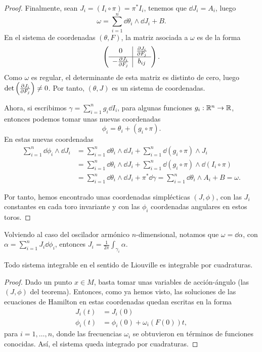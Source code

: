 \begin{proof}
Finalmente, sean $J_i=(I_i \circ \pi)=\pi^* I_i$, tenemos que $\dd J_i = A_i$, luego
\[
  \omega = \sum_{i=1}^n \dd \theta_i \wedge \dd J_i + B.
\]
En el sistema de coordenadas $(\theta,F)$, la matriz asociada a $\omega$ es de la forma
\[
\left(
\begin{array}{c|c}
  0 & \frac{\partial J_i}{\partial F_j} \\
  \hline 
  -\frac{\partial J_i}{\partial F_j} & b_{ij}
\end{array}\right).
\]
Como $\omega$ es regular, el determinante de esta matriz es distinto de cero, luego $\det\left(\frac{\partial J_i}{\partial F_j}\right)\neq 0$. Por tanto, $(\theta,J)$ es un sistema de coordenadas.

Ahora, si escribimos $\gamma= \sum_{i=1}^n g_i \dd I_i$, para algunas funciones $g_i:\mathbb{R}^n \rightarrow \mathbb{R}$, entonces podemos tomar unas nuevas coordenadas 
\[
  \phi_i= \theta_i + (g_i \circ \pi).
\]
En estas nuevas coordenadas
\[
\begin{split}
  \sum_{i=1}^n \dd \phi_i \wedge \dd J_i & = \sum_{i=1}^n \dd \theta_i \wedge \dd J_i + \sum_{i=1}^n \dd(g_i \circ \pi) \wedge J_i \\
   & =\sum_{i=1}^n \dd \theta_i \wedge \dd J_i + \sum_{i=1}^n \dd(g_i \circ \pi) \wedge \dd (I_i \circ \pi) \\
   & =\sum_{i=1}^n \dd \theta_i \wedge \dd J_i + \pi^* \dd \gamma = \sum_{i=1}^n \dd \theta_i \wedge A_i + B = \omega.
\end{split}
\]

Por tanto, hemos encontrado unas coordenadas simplécticas $(J,\phi)$, con las $J_i$ constantes en cada toro invariante y con las $\phi_i$ coordenadas angulares en estos toros.
\end{proof}

\begin{obs}
  Volviendo al caso del oscilador armónico $n$-dimensional, notamos que $\omega=\dd \alpha$, con $\alpha=\sum_{i=1}^n J_i \dd \phi_i$, entonces $J_i=\frac{1}{2\pi}\int_{\gamma_i}\alpha$.
\end{obs}

\begin{corol}
  Todo sistema integrable en el sentido de Liouville es integrable por cuadraturas.
\end{corol}

\begin{proof}
  Dado un punto $x \in M$, basta tomar unas variables de acción-ángulo (las $(J,\phi)$ del teorema). Entonces, como ya hemos visto, las soluciones de las ecuaciones de Hamilton en estas coordenadas quedan escritas en la forma
  \begin{align*}
    J_i(t) & = J_i (0) \\
    \phi_i(t) & = \phi_i(0) + \omega_i(F(0))t,
  \end{align*}
  para $i=1,\dots,n$, donde las frecuencias $\omega_i$ se obtuvieron en términos de funciones conocidas. Así, el sistema queda integrado por cuadraturas.
\end{proof}


